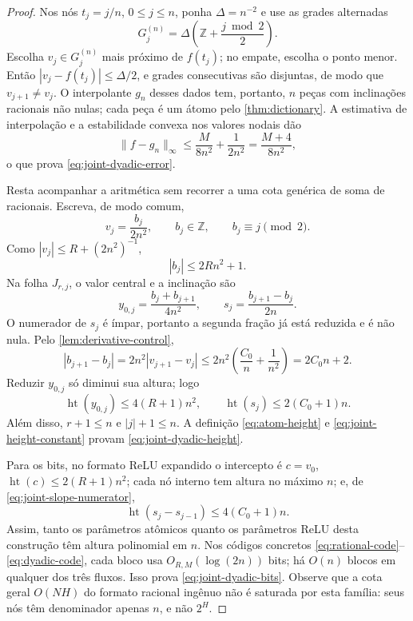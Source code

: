 \documentclass[11pt,a4paper]{article}
\theoremstyle{definition}
\theoremstyle{remark}
\newcommand{\height}{\operatorname{ht}}
\begin{document}
\begin{proof}
Nos nós $t_j=j/n$, $0\le j\le n$, ponha $\Delta=n^{-2}$ e use as grades
alternadas
\begin{equation}
 G_j^{(n)}=\Delta\left(\mathbb Z+\frac{j\bmod2}{2}\right).
 \label{eq:joint-alternating-grid}
\end{equation}
Escolha $v_j\in G_j^{(n)}$ mais próximo de $f(t_j)$; no empate, escolha o
ponto menor. Então $|v_j-f(t_j)|\le\Delta/2$, e grades consecutivas são
disjuntas, de modo que $v_{j+1}\ne v_j$. O interpolante $g_n$ desses dados
tem, portanto, $n$ peças com inclinações racionais não nulas; cada peça é um
átomo pelo \cref{thm:dictionary}. A estimativa de interpolação e a
estabilidade convexa nos valores nodais dão
\[
 \|f-g_n\|_\infty
 \le\frac{M}{8n^2}+\frac{1}{2n^2}
 =\frac{M+4}{8n^2},
\]
o que prova \eqref{eq:joint-dyadic-error}.

Resta acompanhar a aritmética sem recorrer a uma cota genérica de soma de
racionais. Escreva, de modo comum,
\begin{equation}
 v_j=\frac{b_j}{2n^2},\qquad b_j\in\mathbb Z,
 \qquad b_j\equiv j\pmod2.
 \label{eq:joint-common-denominator}
\end{equation}
Como $|v_j|\le R+(2n^2)^{-1}$,
\begin{equation}
 |b_j|\le2Rn^2+1.
 \label{eq:joint-numerator-bound}
\end{equation}
Na folha $J_{r,j}$, o valor central e a inclinação são
\begin{equation}
 y_{0,j}=\frac{b_j+b_{j+1}}{4n^2},
 \qquad
 s_j=\frac{b_{j+1}-b_j}{2n}.
 \label{eq:joint-atom-parameters}
\end{equation}
O numerador de $s_j$ é ímpar, portanto a segunda fração já está reduzida e é
não nula. Pelo \cref{lem:derivative-control},
\begin{equation}
 |b_{j+1}-b_j|
 =2n^2|v_{j+1}-v_j|
 \le2n^2\left(\frac{C_0}{n}+\frac1{n^2}\right)
 =2C_0n+2.
 \label{eq:joint-slope-numerator}
\end{equation}
Reduzir $y_{0,j}$ só diminui sua altura; logo
\begin{equation}
 \height(y_{0,j})\le4(R+1)n^2,
 \qquad
 \height(s_j)\le2(C_0+1)n.
 \label{eq:joint-parameter-heights}
\end{equation}
Além disso, $r+1\le n$ e $|j|+1\le n$. A definição
\eqref{eq:atom-height} e \eqref{eq:joint-height-constant} provam
\eqref{eq:joint-dyadic-height}.

Para os bits, no formato ReLU expandido o intercepto é $c=v_0$,
$\height(c)\le2(R+1)n^2$; cada nó interno tem altura no máximo $n$; e, de
\eqref{eq:joint-slope-numerator},
\[
 \height(s_j-s_{j-1})\le4(C_0+1)n.
\]
Assim, tanto os parâmetros atômicos quanto os parâmetros ReLU desta
construção têm altura polinomial em $n$. Nos códigos concretos
\eqref{eq:rational-code}--\eqref{eq:dyadic-code}, cada bloco usa
$O_{R,M}(\log(2n))$ bits; há $O(n)$ blocos em qualquer dos três fluxos. Isso
prova \eqref{eq:joint-dyadic-bits}. Observe que a cota geral
$O(NH)$ do formato racional ingênuo não é saturada por esta família: seus
nós têm denominador apenas $n$, e não $2^H$.


\end{proof}
\end{document}
